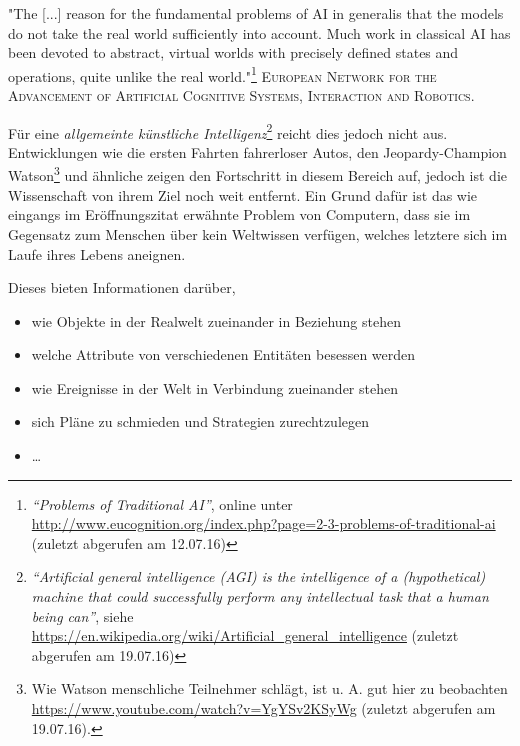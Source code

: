 \newpage
\begin{itquote}
"The [...] reason for the fundamental problems of AI in generalis that the models do
 not take the real world sufficiently into account. Much work in classical AI has been devoted to abstract, virtual
 worlds with precisely defined states and operations, quite unlike the real world."\footnote{\emph{``Problems of Traditional AI''},
 online unter \url{http://www.eucognition.org/index.php?page=2-3-problems-of-traditional-ai} (zuletzt abgerufen am 12.07.16)}
 \flushright
 \textsc{European Network for the Advancement of Artificial Cognitive Systems, Interaction
 and Robotics.}
\end{itquote}


Für eine \emph{allgemeinte künstliche Intelligenz}\footnote{\emph{``Artificial general intelligence (AGI) is the intelligence
of a (hypothetical) machine that could successfully perform any intellectual task that a human being can''}, siehe
\url{https://en.wikipedia.org/wiki/Artificial_general_intelligence} (zuletzt abgerufen am 19.07.16)} reicht dies jedoch nicht aus.
Entwicklungen wie die ersten Fahrten fahrerloser Autos, den Jeopardy-Champion Watson\footnote{Wie Watson menschliche Teilnehmer
schlägt, ist u. A. gut hier zu beobachten \url{https://www.youtube.com/watch?v=YgYSv2KSyWg} (zuletzt abgerufen am 19.07.16).}
und ähnliche zeigen den Fortschritt in diesem Bereich auf, jedoch ist die Wissenschaft von ihrem Ziel noch weit entfernt.
Ein Grund dafür ist das wie eingangs im Eröffnungszitat erwähnte Problem von Computern, dass sie im Gegensatz zum
Menschen über kein Weltwissen verfügen, welches letztere sich im Laufe ihres Lebens aneignen.

Dieses bieten Informationen darüber,
\begin{itemize}
  \item wie Objekte in der Realwelt zueinander in Beziehung stehen
  \item welche Attribute von verschiedenen Entitäten besessen werden
  \item wie Ereignisse in der Welt in Verbindung zueinander stehen
  \item sich Pläne zu schmieden und Strategien zurechtzulegen
  \item \ldots
\end{itemize}

